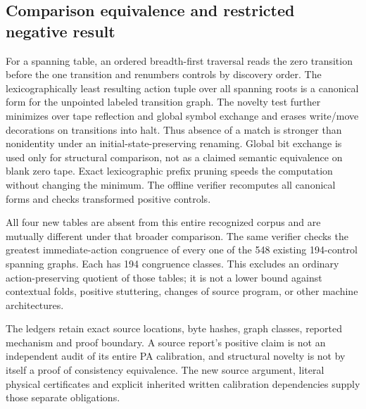 \subsection{Comparison equivalence and restricted negative result}
For a spanning table, an ordered breadth-first traversal reads the zero
transition before the one transition and renumbers controls by discovery
order.  The lexicographically least resulting action tuple over all
spanning roots is a canonical form for the unpointed labeled transition
graph.  The novelty test further minimizes over tape reflection and global
symbol exchange and erases write/move decorations on transitions into
halt.  Thus absence of a match is stronger than nonidentity under an
initial-state-preserving renaming.  Global bit exchange is used only for
structural comparison, not as a claimed semantic equivalence on blank zero
tape.  Exact lexicographic prefix pruning speeds the computation without
changing the minimum.  The offline verifier recomputes all canonical forms
and checks transformed positive controls.

All four new tables are absent from this entire recognized corpus and
are mutually different under that broader comparison.  The same verifier
checks the greatest immediate-action congruence of every one of the 548
existing 194-control spanning graphs.  Each has 194 congruence classes.
This excludes an ordinary action-preserving quotient of those tables;
it is not a lower bound against contextual folds, positive stuttering,
changes of source program, or other machine architectures.

The ledgers retain exact source locations, byte hashes, graph classes,
reported mechanism and proof boundary.  A source report's positive claim
is not an independent audit of its entire PA calibration, and structural
novelty is not by itself a proof of consistency equivalence.  The new
source argument, literal physical certificates and explicit inherited
written calibration dependencies supply those separate obligations.

